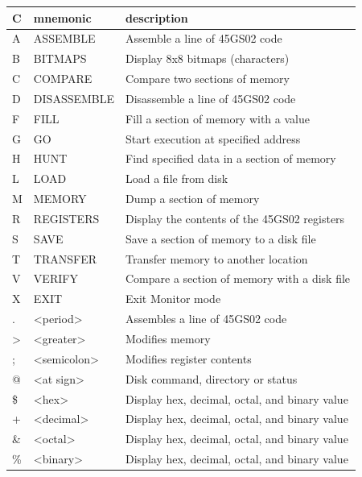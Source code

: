 {
\ttfamily
\setlength{\tabcolsep}{1mm}
\begin{center}
\begin{tabular}{|l|l|l|}
\hline
C & mnemonic & description \\
\hline
A &     ASSEMBLE        & Assemble a line of 45GS02 code\\
B &     BITMAPS         & Display 8x8 bitmaps (characters)\\
C &     COMPARE         & Compare two sections of memory\\
D &     DISASSEMBLE     & Disassemble a line of 45GS02 code\\
F &     FILL            & Fill a section of memory with a value \\
G &     GO              & Start execution at specified address\\
H &     HUNT            & Find specified data in a section of memory\\
L &     LOAD            & Load a file from disk\\
M &     MEMORY          & Dump a section of memory\\
R &     REGISTERS       & Display the contents of the 45GS02 registers\\
S &     SAVE            & Save a section of memory to a disk file\\
T &     TRANSFER        & Transfer memory to another location\\
V &     VERIFY          & Compare a section of memory with a disk file\\
X &     EXIT            & Exit Monitor mode\\
\hline
 . &     <period>        & Assembles a line of 45GS02 code\\
 > &     <greater>       & Modifies memory\\
 ; &     <semicolon>     & Modifies register contents\\
 @ &     <at sign>       & Disk command, directory or status\\
\hline
\$ &     <hex>           & Display hex, decimal, octal, and binary value \\
 + &     <decimal>       & Display hex, decimal, octal, and binary value\\
\& &     <octal>         & Display hex, decimal, octal, and binary value\\
\% &     <binary>        & Display hex, decimal, octal, and binary value\\
\hline
\end{tabular}
\end{center}
}


